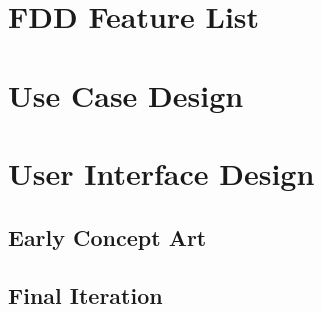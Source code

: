 


\section{FDD Feature List}

\section{Use Case Design}

\section{User Interface Design}

\subsection{Early Concept Art}

\subsection{Final Iteration}